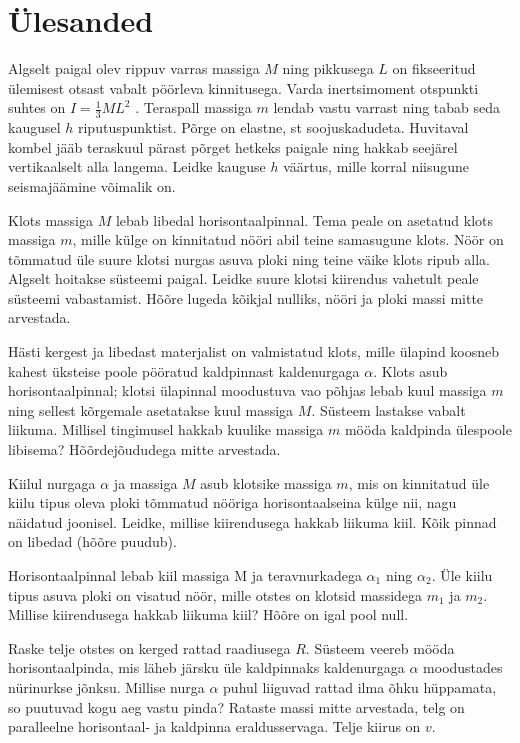 \documentclass[a4paper,11pt,twocolumn]{article}
\begin{document}
\section{Ülesanded}
\begin{question}[Piirk 2015, G6][dun2][3.5cm]
Algselt paigal olev rippuv varras massiga $ M $ ning pikkusega $ L $ on fikseeritud ülemisest otsast vabalt pöörleva kinnitusega. Varda inertsimoment otspunkti suhtes on $ I = \frac{1}{3}ML^2 $ . Teraspall massiga $ m $ lendab vastu varrast ning tabab seda kaugusel $ h $ riputuspunktist. Põrge on elastne, st soojuskadudeta. Huvitaval kombel jääb teraskuul pärast põrget hetkeks paigale ning hakkab seejärel vertikaalselt alla langema. Leidke kauguse $ h $ väärtus, mille korral niisugune seismajäämine võimalik on.
\end{question}
\begin{question}[dun1][3.8cm]
	Klots massiga $ M $ lebab libedal horisontaalpinnal. Tema peale on asetatud klots massiga $ m $, mille külge on kinnitatud nööri abil teine samasugune klots. Nöör on tõmmatud üle suure klotsi nurgas asuva ploki ning teine väike klots ripub alla. Algselt hoitakse süsteemi paigal. Leidke suure klotsi kiirendus vahetult peale süsteemi vabastamist. Hõõre lugeda kõikjal nulliks, nööri ja ploki massi mitte arvestada.
\end{question}
\begin{question}[dun4][5.5cm]
Hästi kergest ja libedast materjalist on valmistatud klots, mille ülapind koosneb kahest üksteise poole pööratud kaldpinnast kaldenurgaga $ \alpha $. Klots asub horisontaalpinnal; klotsi ülapinnal moodustuva vao põhjas lebab kuul massiga $ m $ ning sellest kõrgemale asetatakse kuul massiga $ M $. Süsteem lastakse vabalt liikuma. Millisel tingimusel hakkab kuulike massiga $ m $ mööda kaldpinda ülespoole libisema? Hõõrdejõududega mitte arvestada.
\end{question}
\begin{question}[dun3][5.5cm]
	Kiilul nurgaga $ \alpha $ ja massiga $ M $ asub klotsike massiga $ m $, mis on kinnitatud üle kiilu tipus oleva ploki tõmmatud nööriga horisontaalseina külge nii, nagu näidatud joonisel. Leidke, millise kiirendusega hakkab liikuma kiil. Kõik  pinnad on libedad (hõõre puudub).
\end{question}
\begin{question}[dun5][6cm]
	Horisontaalpinnal lebab kiil massiga M ja teravnurkadega $ \alpha_1 $ ning $ \alpha_2 $. Üle kiilu tipus asuva ploki on visatud nöör, mille otstes on klotsid massidega $ m_1 $ ja $ m_2 $. Millise kiirendusega hakkab liikuma kiil? Hõõre on igal pool null.
\end{question}
\begin{question}[dun8][6cm]
	Raske telje otstes on kerged rattad raadiusega $ R $. Süsteem veereb mööda horisontaalpinda, mis läheb järsku üle kaldpinnaks kaldenurgaga $ \alpha $ moodustades nürinurkse jõnksu. Millise nurga $ \alpha $ puhul liiguvad rattad ilma õhku hüppamata, so puutuvad kogu aeg vastu pinda? Rataste massi mitte arvestada, telg on paralleelne horisontaal- ja kaldpinna eraldusservaga. Telje kiirus on $ v $.
\end{question}
\end{document}
